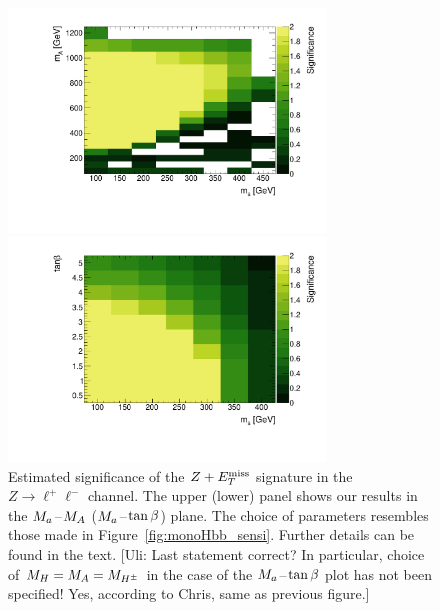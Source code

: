 \begin{figure}[t!]
\centering
\includegraphics[width=0.75\textwidth]{texinputs/04_grid/figures/monoz/leptonic/mAma_Significance_ll.pdf}

\vspace{2mm}

\includegraphics[width=0.75\textwidth]{texinputs/04_grid/figures/monoz/leptonic/tanbma_Significance_ll.pdf}
\vspace{2mm}
\caption{Estimated significance of the $Z+E_T^\mathrm{miss}$ signature in the $Z \to \ell^+ \ell^-$ channel. The upper (lower) panel shows our results in the $M_{a}\hspace{0.25mm}$--$\hspace{0.25mm}M_{A}$ ($M_{a}\hspace{0.25mm}$--$\hspace{0.25mm}\tan \beta$) plane. The choice of parameters resembles those made in Figure~\ref{fig:monoHbb_sensi}. Further details can be found in the text. {\color{red} [Uli: Last statement correct? In particular, choice of $M_{H} = M_{A} = M_{H^{\pm}}$ in the case of the $M_{a}\hspace{0.25mm}$--$\hspace{0.25mm}\tan \beta$ plot has not been specified!  Yes, according to Chris, same as previous figure.] }}
\label{fig:monoZll_sensi}
\end{figure}

